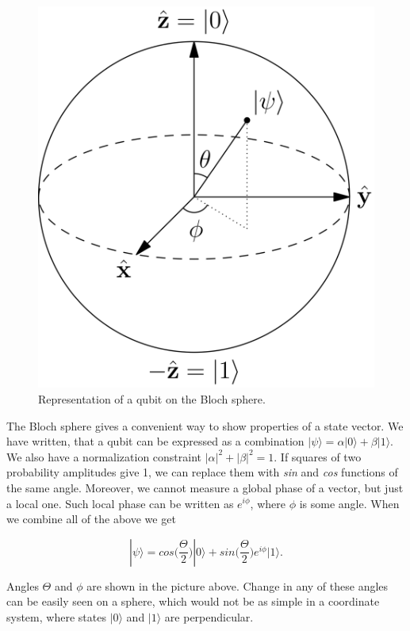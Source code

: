 \begin{figure}[ht]
\centering
\includegraphics[scale=0.1]{bloch_sphere}
\caption{Representation of a qubit on the Bloch sphere.}
\end{figure}

The Bloch sphere gives a convenient way to show properties of a state vector. We have written, that a qubit can be expressed as a combination $|\psi\rangle = \alpha |0\rangle + \beta|1\rangle$. We also have a normalization constraint $|\alpha|^2 + |\beta|^2 = 1$. If squares of two probability amplitudes give 1, we can replace them with \textit{sin} and \textit{cos} functions of the same angle. Moreover, we cannot measure a global phase of a vector, but just a local one. Such local phase can be written as $e^{i \phi}$, where $\phi$ is some angle. When we combine all of the above we get

\[ |\psi\rangle = cos\bigg( \frac{\Theta}{2}\bigg)|0\rangle + sin\bigg( \frac{\Theta}{2}\bigg) e^{i \phi}|1\rangle.\]

Angles $\Theta$ and $\phi$ are shown in the picture above. Change in any of these angles can be easily seen on a sphere, which would not be as simple in a coordinate system, where states $|0\rangle$ and $|1\rangle$ are perpendicular.


